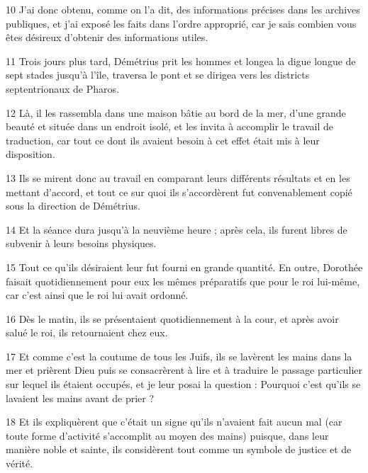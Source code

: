 \par 10 J'ai donc obtenu, comme on l'a dit, des informations précises dans les archives publiques, et j'ai exposé les faits dans l'ordre approprié, car je sais combien vous êtes désireux d'obtenir des informations utiles.

\par 11 Trois jours plus tard, Démétrius prit les hommes et longea la digue longue de sept stades jusqu'à l'île, traversa le pont et se dirigea vers les districts septentrionaux de Pharos.

\par 12 Là, il les rassembla dans une maison bâtie au bord de la mer, d'une grande beauté et située dans un endroit isolé, et les invita à accomplir le travail de traduction, car tout ce dont ils avaient besoin à cet effet était mis à leur disposition.

\par 13 Ils se mirent donc au travail en comparant leurs différents résultats et en les mettant d'accord, et tout ce sur quoi ils s'accordèrent fut convenablement copié sous la direction de Démétrius.

\par 14 Et la séance dura jusqu'à la neuvième heure ; après cela, ils furent libres de subvenir à leurs besoins physiques.

\par 15 Tout ce qu'ils désiraient leur fut fourni en grande quantité. En outre, Dorothée faisait quotidiennement pour eux les mêmes préparatifs que pour le roi lui-même, car c'est ainsi que le roi lui avait ordonné.

\par 16 Dès le matin, ils se présentaient quotidiennement à la cour, et après avoir salué le roi, ils retournaient chez eux.

\par 17 Et comme c'est la coutume de tous les Juifs, ils se lavèrent les mains dans la mer et prièrent Dieu puis se consacrèrent à lire et à traduire le passage particulier sur lequel ils étaient occupés, et je leur posai la question : Pourquoi c'est qu'ils se lavaient les mains avant de prier ?

\par 18 Et ils expliquèrent que c'était un signe qu'ils n'avaient fait aucun mal (car toute forme d'activité s'accomplit au moyen des mains) puisque, dans leur manière noble et sainte, ils considèrent tout comme un symbole de justice et de vérité.

